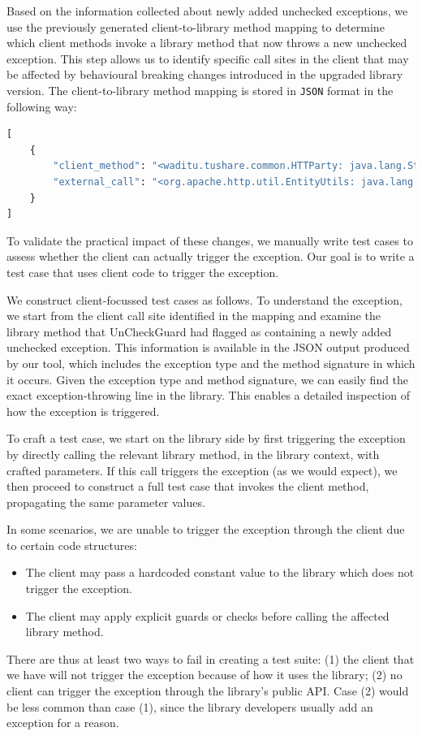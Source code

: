 Based on the information collected about newly added unchecked exceptions, we use the previously generated client-to-library method mapping to determine which client methods invoke a library method that now throws a new unchecked exception. This step allows us to identify specific call sites in the client that may be affected by behavioural breaking changes introduced in the upgraded library version. The client-to-library method mapping is stored in \texttt{JSON} format in the following way:

\begin{lstlisting}[language=python]
[
    {
        "client_method": "<waditu.tushare.common.HTTParty: java.lang.String get(java.lang.String,java.lang.String)>",
        "external_call": "<org.apache.http.util.EntityUtils: java.lang.String toString(org.apache.http.HttpEntity,java.lang.String)>"
    }
]
\end{lstlisting}

To validate the practical impact of these changes, we manually write test cases to assess whether the client can actually trigger the exception. Our goal is to write a test case that uses client code to trigger the exception.

We construct client-focussed test cases as follows. To understand the exception, we start from the client call site identified in the mapping and examine the library method that UnCheckGuard had flagged as containing a newly added unchecked exception. This information is available in the JSON output produced by our tool, which includes the exception type and the method signature in which it occurs. Given the exception type and method signature, we can easily find the exact exception-throwing line in the library. This enables a detailed inspection of how the exception is triggered.

To craft a test case, we start on the library side by first triggering the exception by directly calling the relevant library method, in the library context, with crafted parameters. If this call triggers the exception (as we would expect), we then proceed to construct a full test case that invokes the client method, propagating the same parameter values.

In some scenarios, we are unable to trigger the exception through the client due to certain code structures:
\begin{itemize}
  \item The client may pass a hardcoded constant value to the library which does not trigger the exception.
  \item The client may apply explicit guards or checks before calling the affected library method.
\end{itemize}
There are thus at least two ways to fail in creating a test suite: (1) the client that we have will not trigger the exception because of how it uses the library; (2) no client can trigger the exception through the library's public API. Case (2) would be less common than case (1), since the library developers usually add an exception for a reason.


